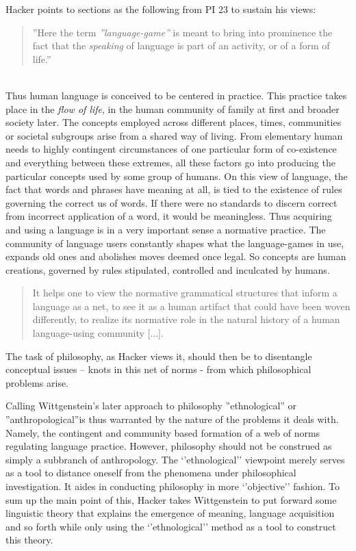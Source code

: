 \documentclass{article}
\begin{document}
Hacker points to sections as the following from PI 23 to sustain his views:
\begin{quote}
''Here the term \textit{''language-game''} is meant to bring into prominence
the fact that the \textit{speaking} of language is part of an activity, or of a form
of life.''
\end{quote}\\ %
Thus human language is conceived to be centered in practice. This practice takes place in the \textit{flow of life}, in the human community of family at first and broader society later. The concepts employed across different places, times, communities or societal subgroups arise from a shared way of living. From elementary human needs to highly contingent circumstances of one particular form of co-existence and everything between these extremes, all these factors go into producing the particular concepts used by some group of humans.
On this view of language, the fact that words and phrases have meaning at all, is tied to the existence of rules governing the correct us of words. If there were no standards to discern correct from incorrect application of a word, it would be meaningless. 
Thus acquiring and using a language is in a very important sense a normative practice. The community of language users constantly shapes what the language-games in use, expands old ones and abolishes moves deemed once legal.
So concepts are human creations, governed by rules stipulated, controlled and inculcated by humans. \begin{quote}
It helps one to view the normative grammatical structures that inform a language as a net, to see it as a human artifact that could have been woven differently, to realize its normative role in the natural history of a human language-using community [...].
\end{quote}
The task of philosophy, as Hacker views it, should then be to disentangle conceptual issues – knots in this net of norms - from which philosophical problems arise.

 Calling Wittgenstein's later approach to philosophy ''ethnological'' or ''anthropological''is thus warranted by the nature of the problems it deals with. Namely, the contingent and community based formation of a web of norms regulating language practice. However, philosophy should not be construed as simply a subbranch of anthropology. The ‘’ethnological’’ viewpoint merely serves as a tool to distance oneself from the phenomena under philosophical investigation. It aides in conducting philosophy in more ‘’objective’’ fashion.
To sum up the main point of this, Hacker takes Wittgenstein to put forward some linguistic theory that explains the emergence of meaning, language acquisition and so forth while only using the ‘’ethnological’’ method as a tool to construct this theory.
\end{document}
